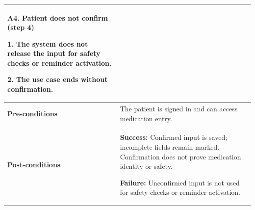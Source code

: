 \begin{longtable}{|p{}|p{}|}
\textbf{A4. Patient does not confirm (step 4)}\par
1. The system does not release the input for safety checks or reminder activation.\par
2. The use case ends without confirmation.
\\ \hline
\textbf{Pre-conditions} & The patient is signed in and can access medication entry. \\ \hline
\textbf{Post-conditions} & \textbf{Success:} Confirmed input is saved; incomplete fields remain marked. Confirmation does not prove medication identity or safety.\par
\textbf{Failure:} Unconfirmed input is not used for safety checks or reminder activation. \\ \hline
\end{longtable}

\clearpage
